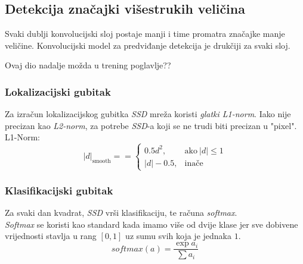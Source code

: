 \subsection{Detekcija značajki višestrukih veličina}
Svaki dublji konvolucijski sloj postaje manji i time promatra značajke manje veličine.
Konvolucijski model za predviđanje detekcija je drukčiji za svaki sloj.

Ovaj dio nadalje možda u trening poglavlje??

\subsubsection{Lokalizacijski gubitak}
Za izračun lokalizacijskog gubitka \emph{SSD} mreža koristi \emph{glatki L1-norm}.
Iako nije precizan kao \emph{L2-norm}, za potrebe \emph{SSD}-a koji se ne trudi biti precizan u "pixel". \\
L1-Norm: 
$$| d |_{\text{smooth}} = =   \begin{cases} 0.5 d^2, & \text{ako}\ | d  | \leq 1 \\ | d | - 0.5, & \text{inače} \end{cases} $$
\subsubsection{Klasifikacijski gubitak}
Za svaki dan kvadrat, \emph{SSD} vrši klasifikaciju, te računa \emph{softmax}. \\
\emph{Softmax} se koristi kao standard kada imamo više od dvije klase jer sve dobivene vrijednosti stavlja u rang $[0, 1]$ uz sumu svih koja je jednaka $1$.
$$softmax(a)=\frac{\exp{a_i}}{\sum{a_i}}$$
